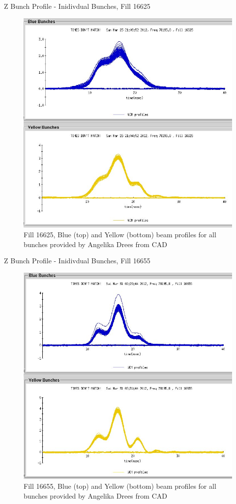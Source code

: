 \begin{frame}{Z Bunch Profile - Inidivdual Bunches, Fill 16625}
\begin{figure}
\begin{center}
\includegraphics[width=0.5\linewidth]{../ZBunchProfileStudies/figs/wcm_16625.jpeg}
\end{center}
\caption{ Fill 16625, Blue (top) and Yellow (bottom) beam profiles for all bunches provided by Angelika Drees from CAD}
\label{fig:wcm_16625}
\end{figure}
\end{frame}

\begin{frame}{Z Bunch Profile - Inidivdual Bunches, Fill 16655}
\begin{figure}
\begin{center}
\includegraphics[width=0.5\linewidth]{../ZBunchProfileStudies/figs/wcm_16655.jpeg}
\end{center}
\caption{ Fill 16655, Blue (top) and Yellow (bottom) beam profiles for all bunches provided by Angelika Drees from CAD}
\label{fig:wcm_16655}
\end{figure}
\end{frame}

